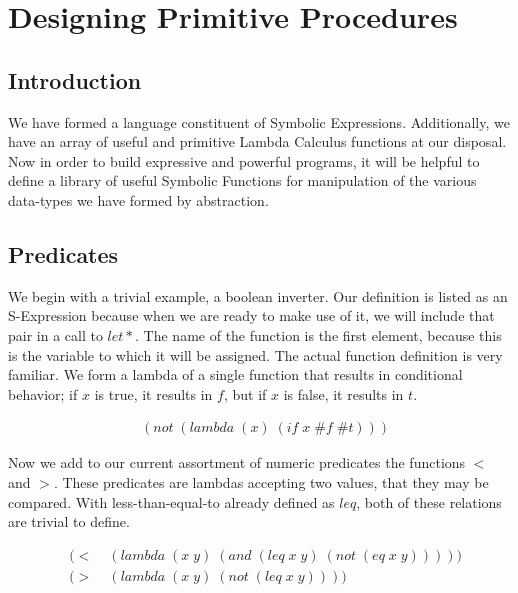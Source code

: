 
\chapter{Designing Primitive Procedures}
\section{Introduction}
We have formed a language constituent of Symbolic Expressions. Additionally, we 
have an array of useful and primitive Lambda Calculus functions at our disposal. 
Now in order to build expressive and powerful programs, it will be helpful to 
define a library of useful Symbolic Functions for manipulation of the various 
data-types we have formed by abstraction.

\section{Predicates}
We begin with a trivial example, a boolean inverter. Our definition is listed as 
an S-Expression because when we are ready to make use of it, we will include that 
pair in a call to $let*$. The name of the function is the first element, because 
this is the variable to which it will be assigned. The actual function definition 
is very familiar. We form a lambda of a single function that results in 
conditional behavior; if $x$ is true, it results in $f$, but if $x$ is false, it 
results in $t$.

\begin{figure}[htp]
\caption{}\label{fig:notDef}
\begin{align*}
& (not \; (lambda \; (x) \; (if \; x \; \#f \; \#t)))
\end{align*}
\end{figure}

Now we add to our current assortment of numeric predicates the functions $<$ and 
$>$. These predicates are lambdas accepting two values, that they may be compared. 
With less-than-equal-to already defined as $leq$, both of these relations are 
trivial to define.

\begin{figure}[htp]
\caption{}\label{fig:ltGtDefs}
\begin{align*}
& (< \; &(lambda \; (x \; y) \; (and \; (leq \; x \; y) \; (not \; (eq \; x \; y)))))
\\& (> \; &(lambda \; (x \; y) \; (not \; (leq \; x \; y))))
\end{align*}
\end{figure}

